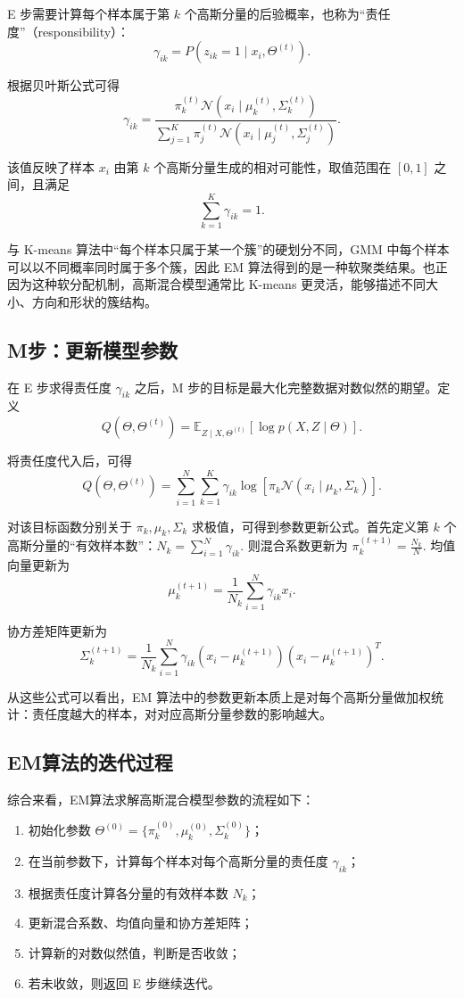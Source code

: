 \documentclass[12pt,a4paper]{ctexart}
\begin{document}
E 步需要计算每个样本属于第 $k$ 个高斯分量的后验概率，也称为“责任度”（responsibility）：
\[
\gamma_{ik}
=
P(z_{ik}=1\mid x_i,\Theta^{(t)}).
\]

根据贝叶斯公式可得
\[
\gamma_{ik}
=
\frac{\pi_k^{(t)} \mathcal{N}(x_i\mid \mu_k^{(t)},\Sigma_k^{(t)})}
{\sum_{j=1}^{K}\pi_j^{(t)} \mathcal{N}(x_i\mid \mu_j^{(t)},\Sigma_j^{(t)})}.
\]

该值反映了样本 $x_i$ 由第 $k$ 个高斯分量生成的相对可能性，取值范围在 $[0,1]$ 之间，且满足
\[
\sum_{k=1}^{K}\gamma_{ik}=1.
\]

与 K-means 算法中“每个样本只属于某一个簇”的硬划分不同，GMM 中每个样本可以以不同概率同时属于多个簇，因此 EM 算法得到的是一种软聚类结果。也正因为这种软分配机制，高斯混合模型通常比 K-means 更灵活，能够描述不同大小、方向和形状的簇结构。

\subsection*{M步：更新模型参数}

在 E 步求得责任度 $\gamma_{ik}$ 之后，M 步的目标是最大化完整数据对数似然的期望。定义
\[
Q(\Theta,\Theta^{(t)})=
\mathbb{E}_{Z\mid X,\Theta^{(t)}}[\log p(X,Z\mid \Theta)].
\]

将责任度代入后，可得
\[
Q(\Theta,\Theta^{(t)})
=
\sum_{i=1}^{N}\sum_{k=1}^{K}
\gamma_{ik}\log\left[\pi_k \mathcal{N}(x_i\mid \mu_k,\Sigma_k)\right].
\]

对该目标函数分别关于 $\pi_k,\mu_k,\Sigma_k$ 求极值，可得到参数更新公式。首先定义第 $k$ 个高斯分量的“有效样本数”：$N_k=\sum_{i=1}^{N}\gamma_{ik}.$ 则混合系数更新为 $\pi_k^{(t+1)}=\frac{N_k}{N}.$ 均值向量更新为
\[
\mu_k^{(t+1)}=
\frac{1}{N_k}\sum_{i=1}^{N}\gamma_{ik}x_i.
\]

协方差矩阵更新为
\[
\Sigma_k^{(t+1)}=
\frac{1}{N_k}\sum_{i=1}^{N}\gamma_{ik}
(x_i-\mu_k^{(t+1)})(x_i-\mu_k^{(t+1)})^T.
\]

从这些公式可以看出，EM 算法中的参数更新本质上是对每个高斯分量做加权统计：责任度越大的样本，对对应高斯分量参数的影响越大。

\subsection*{EM算法的迭代过程}

综合来看，EM算法求解高斯混合模型参数的流程如下：

\begin{enumerate}
	\item 初始化参数 $\Theta^{(0)}=\{\pi_k^{(0)},\mu_k^{(0)},\Sigma_k^{(0)}\}$；
	\item 在当前参数下，计算每个样本对每个高斯分量的责任度 $\gamma_{ik}$；
	\item 根据责任度计算各分量的有效样本数 $N_k$；
	\item 更新混合系数、均值向量和协方差矩阵；
	\item 计算新的对数似然值，判断是否收敛；
	\item 若未收敛，则返回 E 步继续迭代。
\end{enumerate}
\end{document}
